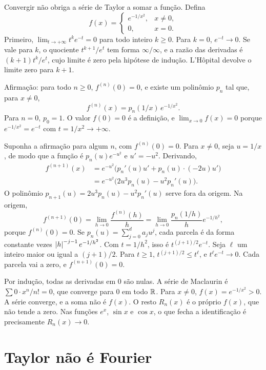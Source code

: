 \documentclass[11pt,a4paper]{article}
\begin{document}
\begin{contraexemplo}
Convergir não obriga a série de Taylor a somar a função. Defina
\[
f(x)=\begin{cases}
e^{-1/x^2},& x\neq 0,\\
0,& x=0.
\end{cases}
\]
Primeiro, \(\lim_{t\to+\infty} t^k e^{-t}=0\) para todo inteiro \(k\ge 0\). Para \(k=0\), \(e^{-t}\to 0\). Se vale para \(k\), o quociente \(t^{k+1}/e^t\) tem forma \(\infty/\infty\), e a razão das derivadas é \((k+1)t^k/e^t\), cujo limite é zero pela hipótese de indução. L'Hôpital devolve o limite zero para \(k+1\).

Afirmação: para todo \(n\ge 0\), \(f^{(n)}(0)=0\), e existe um polinômio \(p_n\) tal que, para \(x\neq 0\),
\[
f^{(n)}(x)=p_n(1/x)\,e^{-1/x^2}.
\]
Para \(n=0\), \(p_0=1\). O valor \(f(0)=0\) é a definição, e \(\lim_{x\to 0}f(x)=0\) porque \(e^{-1/x^2}=e^{-t}\) com \(t=1/x^2\to+\infty\).

Suponha a afirmação para algum \(n\), com \(f^{(n)}(0)=0\). Para \(x\neq 0\), seja \(u=1/x\), de modo que a função é \(p_n(u)e^{-u^2}\) e \(u'=-u^2\). Derivando,
\begin{align*}
f^{(n+1)}(x)
&=e^{-u^2}\bigl(p_n'(u)u'+p_n(u)\cdot(-2u)u'\bigr)\\
&=e^{-u^2}\bigl(2u^3 p_n(u)-u^2 p_n'(u)\bigr).
\end{align*}
O polinômio \(p_{n+1}(u)=2u^3 p_n(u)-u^2 p_n'(u)\) serve fora da origem. Na origem,
\[
f^{(n+1)}(0)=\lim_{h\to 0}\frac{f^{(n)}(h)}{h}=\lim_{h\to 0}\frac{p_n(1/h)}{h}e^{-1/h^2},
\]
porque \(f^{(n)}(0)=0\). Se \(p_n(u)=\sum_{j=0}^{d} a_j u^j\), cada parcela é da forma constante vezes \(\left\lvert h \right\rvert^{-j-1}e^{-1/h^2}\). Com \(t=1/h^2\), isso é \(t^{(j+1)/2}e^{-t}\). Seja \(\ell\) um inteiro maior ou igual a \((j+1)/2\). Para \(t\ge 1\), \(t^{(j+1)/2}\le t^\ell\), e \(t^\ell e^{-t}\to 0\). Cada parcela vai a zero, e \(f^{(n+1)}(0)=0\).

Por indução, todas as derivadas em \(0\) são nulas. A série de Maclaurin é \(\sum 0\cdot x^n/n!=0\), que converge para \(0\) em todo \(\mathbb{R}\). Para \(x\neq 0\), \(f(x)=e^{-1/x^2}>0\). A série converge, e a soma não é \(f(x)\). O resto \(R_n(x)\) é o próprio \(f(x)\), que não tende a zero. Nas funções \(e^x\), \(\sin x\) e \(\cos x\), o que fecha a identificação é precisamente \(R_n(x)\to 0\).
\end{contraexemplo}

\section{Taylor não é Fourier}
\end{document}
